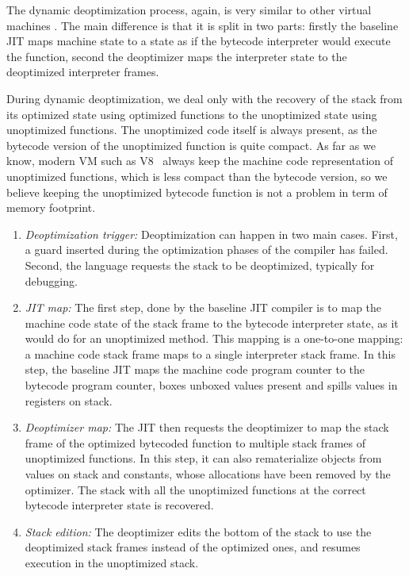 \documentclass[a4paper,12pt,twoside]{../includes/ThesisStyle}
\begin{document}
The dynamic deoptimization process, again, is very similar to other virtual machines \cite{Fin03a, Holz92a}. The main difference is that it is split in two parts: firstly the baseline JIT maps  machine state to a state as if the bytecode interpreter would execute the function, second the deoptimizer maps the interpreter state to the deoptimized interpreter frames.

During dynamic deoptimization, we deal only with the recovery of the stack from its optimized state using optimized functions to the  unoptimized state using unoptimized functions. The unoptimized code itself is always present, as the bytecode version of the  unoptimized function is quite compact. As far as we know, modern VM such as V8~\cite{V8} always keep the machine code representation of unoptimized functions, which is less compact than the bytecode version, so we believe keeping the unoptimized bytecode function is not a problem in term of memory footprint.

\begin{enumerate}
\item \emph{Deoptimization trigger:} Deoptimization can happen in two main cases. First, a guard inserted during the optimization phases of the compiler has failed. Second, the language requests the stack to be deoptimized, typically for debugging.
\item \emph{JIT map:} The first step, done by the baseline JIT compiler is to map the machine code state of the stack frame to the bytecode interpreter state, as it would do for an unoptimized method. This mapping is a one-to-one mapping: a machine code stack frame maps to a single interpreter stack frame. In this step, the baseline JIT maps the machine code program counter to the bytecode program counter, boxes unboxed values present and spills values in registers on stack.
\item \emph{Deoptimizer map:} The JIT then requests the deoptimizer to map the stack frame of the optimized bytecoded function to multiple stack frames of unoptimized functions. In this step, it can also rematerialize objects from values on stack and constants, whose allocations have been removed by the optimizer. The stack with all the unoptimized functions at the correct bytecode interpreter state is recovered.
\item \emph{Stack edition:}
The deoptimizer edits the bottom of the stack to use the deoptimized stack frames instead of the optimized ones, and resumes execution in the unoptimized stack.
\end{enumerate}
\end{document}
